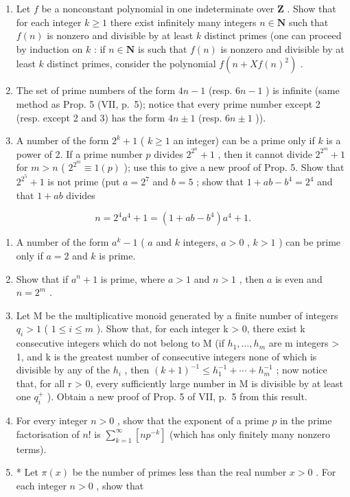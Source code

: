 \begin{enumerate}
\def\labelenumi{\arabic{enumi})}
\setcounter{enumi}{12}
\item
  Let \(f\) be a nonconstant polynomial in one indeterminate over \(\mathbf{Z}\) . Show that for each integer \(k \geqslant 1\) there exist infinitely many integers \(n \in \mathbf{N}\) such that \(f(n)\) is nonzero and divisible by at least \(k\) distinct primes (one can proceed by induction on \(k\) : if \(n \in \mathbf{N}\) is such that \(f(n)\) is nonzero and divisible by at least \(k\) distinct primes, consider the polynomial \(f(n + Xf(n)^2)\) .
\item
  The set of prime numbers of the form \(4n - 1\) (resp. \(6n - 1\) ) is infinite (same method as Prop. 5 (VII, p.~5); notice that every prime number except 2 (resp. except 2 and 3) has the form \(4n \pm 1\) (resp. \(6n \pm 1\) )).
\item
  A number of the form \(2^k + 1\) ( \(k \geqslant 1\) an integer) can be a prime only if \(k\) is a power of 2. If a prime number \(p\) divides \(2^{2^n} + 1\) , then it cannot divide \(2^{2^m} + 1\) for \(m > n\) ( \(2^{2^m} \equiv 1(p)\) ); use this to give a new proof of Prop. 5. Show that \(2^{2^5} + 1\) is not prime (put \(a = 2^7\) and \(b = 5\) ; show that \(1 + ab - b^4 = 2^4\) and that \(1 + ab\) divides
\end{enumerate}

\[
n = 2 ^ {4} a ^ {4} + 1 = (1 + a b - b ^ {4}) a ^ {4} + 1.
\]

\begin{enumerate}
\def\labelenumi{\arabic{enumi})}
\setcounter{enumi}{15}
\item
  A number of the form \(a^k - 1\) ( \(a\) and \(k\) integers, \(a > 0\) , \(k > 1\) ) can be prime only if \(a = 2\) and \(k\) is prime.
\item
  Show that if \(a^n + 1\) is prime, where \(a > 1\) and \(n > 1\) , then \(a\) is even and \(n = 2^m\) .
\item
  Let M be the multiplicative monoid generated by a finite number of integers \(q_{i} > 1\) ( \(1 \leqslant i \leqslant m\) ). Show that, for each integer k \textgreater{} 0, there exist k consecutive integers which do not belong to M (if \(h_{1}, \ldots, h_{m}\) are m integers \textgreater{} 1, and k is the greatest number of consecutive integers none of which is divisible by any of the \(h_{i}\) , then \((k + 1)^{-1} \leqslant h_{1}^{-1} + \cdots + h_{m}^{-1}\) ; now notice that, for all r \textgreater{} 0, every sufficiently large number in M is divisible by at least one \(q_{i}^{+}\) ). Obtain a new proof of Prop. 5 of VII, p.~5 from this result.
\item
  For every integer \(n > 0\) , show that the exponent of a prime \(p\) in the prime factorisation of \(n!\) is \(\sum_{k=1}^{\infty} [np^{-k}]\) (which has only finitely many nonzero terms).
\item
  * Let \(\pi(x)\) be the number of primes less than the real number \(x > 0\) . For each integer \(n > 0\) , show that
\end{enumerate}

